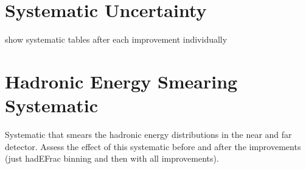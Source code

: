 \section{Systematic Uncertainty}

show systematic tables after each improvement individually


\section{Hadronic Energy Smearing Systematic}

Systematic that smears the hadronic energy distributions in the near
and far detector. Assess the effect of this systematic before and
after the improvements (just hadEFrac binning and then with all
improvements).


